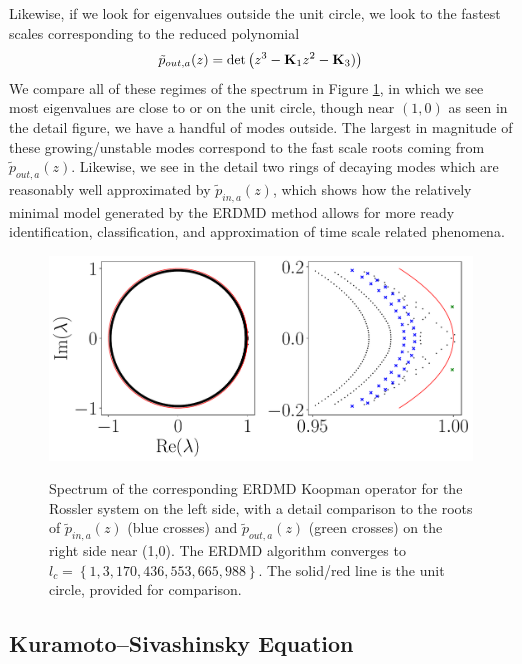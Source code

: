 \documentclass[a4paper,11pt]{article}
\begin{document}
Likewise, if we look for eigenvalues outside the unit circle, we look to the fastest scales corresponding to the reduced polynomial
\[
\tilde{p}_{out,a}(z) = \text{det}\left(z^{3} - {\bf K}_{1}z^{2} - {\bf K}_{3}) \right)
\]
We compare all of these regimes of the spectrum in Figure \ref{fig:rossler_spectrum}, in which we see most eigenvalues are close to or on the unit circle, though near $(1,0)$ as seen in the detail figure, we have a handful of modes outside.  The largest in magnitude of these growing/unstable modes correspond to the fast scale roots coming from $\tilde{p}_{out,a}(z)$.  Likewise, we see in the detail two rings of decaying modes which are reasonably well approximated by $\tilde{p}_{in,a}(z)$, which shows how the relatively minimal model generated by the ERDMD method allows for more ready identification, classification, and approximation of time scale related phenomena.   

\begin{figure}[!h]
\centering
\includegraphics[width=1.\textwidth]{Rossler_detail_spectrum_w_mx_lag_988}\\
\caption{Spectrum of the corresponding ERDMD Koopman operator for the Rossler system on the left side, with a detail comparison to the roots of $\tilde{p}_{in,a}(z)$ (blue crosses) and $\tilde{p}_{out,a}(z)$ (green crosses) on the right side near (1,0).  The ERDMD algorithm converges to $l_{c}= \left\{1, 3, 170, 436, 553, 665, 988\right\}$.  The solid/red line is the unit circle, provided for comparison.}
\label{fig:rossler_spectrum}
\end{figure}

\subsection*{Kuramoto--Sivashinsky Equation}
\end{document}
